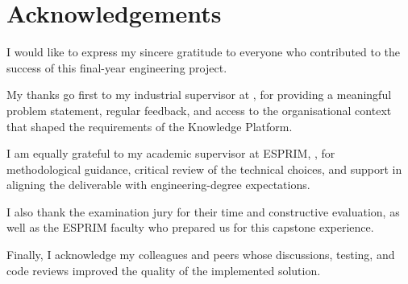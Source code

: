 \chapter*{Acknowledgements}

I would like to express my sincere gratitude to everyone who contributed to the success of this final-year engineering project.

My thanks go first to my industrial supervisor at \CompanyName{}, for providing a meaningful problem statement, regular feedback, and access to the organisational context that shaped the requirements of the Knowledge Platform.

I am equally grateful to my academic supervisor at ESPRIM, \AcademicSupervisor{}, for methodological guidance, critical review of the technical choices, and support in aligning the deliverable with engineering-degree expectations.

I also thank the examination jury for their time and constructive evaluation, as well as the ESPRIM faculty who prepared us for this capstone experience.

Finally, I acknowledge my colleagues and peers whose discussions, testing, and code reviews improved the quality of the implemented solution.
